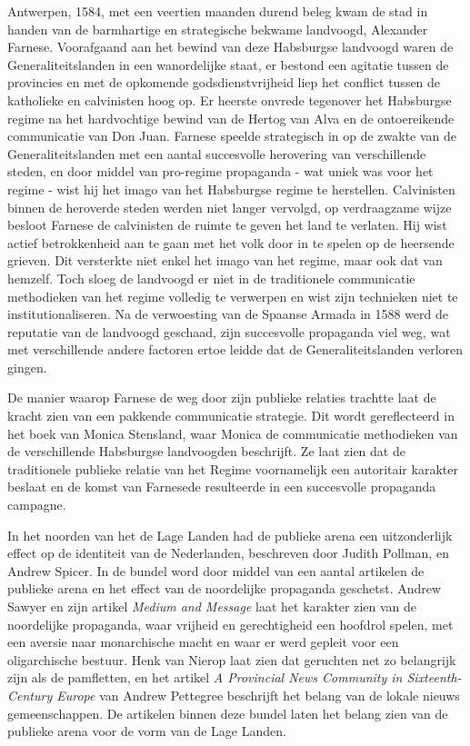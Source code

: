 \documentclass[11pt]{amsart}
\begin{document}
\noindent Antwerpen, 1584, met een veertien maanden durend beleg kwam de stad in handen van de barmhartige en
strategische bekwame landvoogd, Alexander Farnese. Voorafgaand aan het bewind van deze Habsburgse landvoogd waren de
Generaliteitslanden in een wanordelijke staat, er bestond een agitatie tussen de provincies en met de opkomende
godsdienstvrijheid liep het conflict tussen de katholieke en calvinisten hoog op. Er heerste
onvrede tegenover het Habsburgse regime na het hardvochtige bewind van de Hertog van Alva en de ontoereikende communicatie van Don Juan.
Farnese speelde strategisch in op de zwakte van de Generaliteitslanden met een
aantal succesvolle herovering van verschillende steden, en door middel van pro-regime propaganda - wat uniek was voor
het regime - wist hij het imago van het Habsburgse regime te herstellen. Calvinisten binnen de heroverde steden werden
niet langer vervolgd, op verdraagzame wijze besloot Farnese de calvinisten de ruimte te geven het land te verlaten.
Hij wist actief betrokkenheid aan te gaan met het volk door in te spelen op de heersende grieven. Dit versterkte niet
enkel het imago van het regime, maar ook dat van hemzelf. Toch sloeg de landvoogd er niet in de traditionele communicatie
methodieken van het regime volledig te verwerpen en wist zijn technieken niet te institutionaliseren.
Na de verwoesting van de Spaanse Armada in 1588 werd de reputatie van de landvoogd geschaad, zijn succesvolle propaganda viel weg,
wat met verschillende andere factoren ertoe leidde dat de Generaliteitslanden verloren gingen.

De manier waarop Farnese de weg door zijn publieke relaties trachtte laat de kracht zien van een pakkende communicatie
strategie. Dit wordt gereflecteerd in het boek van Monica Stensland, waar Monica de communicatie methodieken van de
verschillende Habsburgse landvoogden beschrijft. Ze laat zien dat de traditionele publieke relatie van het Regime
voornamelijk een autoritair karakter beslaat en de komst van Farnesede resulteerde in een succesvolle propaganda
campagne\autocite{stenslandHabsburgCommunicationDutch2012}.

In het noorden van het de Lage Landen had de publieke arena een uitzonderlijk effect op de identiteit van de
Nederlanden, beschreven door Judith Pollman, en Andrew Spicer\autocite{pollmannPublicOpinionChanging2007}. In de bundel
word door middel van een aantal artikelen de publieke arena en het effect van de noordelijke propaganda geschetst.
Andrew Sawyer en zijn artikel \textit{Medium and Message} laat het karakter zien van de noordelijke propaganda, waar
vrijheid en gerechtigheid een hoofdrol spelen, met een aversie naar monarchische macht en waar er werd gepleit voor een
oligarchische bestuur. Henk van Nierop\autocite{vannieropYeShallHear2007} laat zien dat geruchten net zo belangrijk
zijn als de pamfletten, en het artikel \textit{A Provincial News Community in Sixteenth-Century Europe} van Andrew
Pettegree\autocite{pettegreeProvincialNewsCommunity2007} beschrijft het belang van de lokale nieuws gemeenschappen. De
artikelen binnen deze bundel laten het belang zien van de publieke arena voor de vorm van de Lage Landen.
\end{document}
